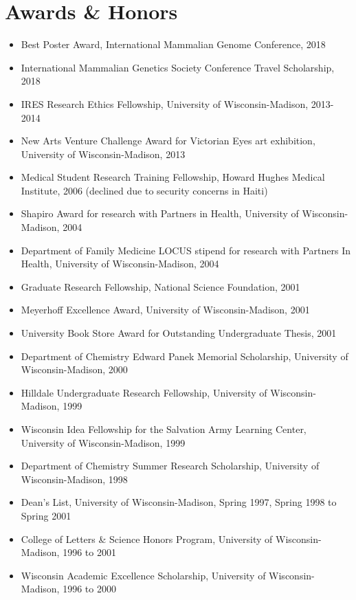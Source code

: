 \section*{Awards \& Honors}
\begin{itemize}
\item Best Poster Award, International Mammalian Genome Conference, 2018
\item International Mammalian Genetics Society Conference Travel Scholarship, 2018
\item IRES Research Ethics Fellowship, University of Wisconsin-Madison, 2013-2014
\item New Arts Venture Challenge Award for Victorian Eyes art exhibition, University of Wisconsin-Madison, 2013
\item Medical Student Research Training Fellowship, Howard Hughes Medical Institute, 2006 (declined due to security concerns in Haiti)
\item Shapiro Award for research with Partners in Health, University of Wisconsin-Madison, 2004
\item Department of Family Medicine LOCUS stipend for research with Partners In Health, University of Wisconsin-Madison, 2004
\item Graduate Research Fellowship, National Science Foundation, 2001
\item Meyerhoff Excellence Award, University of Wisconsin-Madison, 2001
\item University Book Store Award for Outstanding Undergraduate Thesis, 2001
\item Department of Chemistry Edward Panek Memorial Scholarship, University of Wisconsin-Madison, 2000
\item Hilldale Undergraduate Research Fellowship, University of Wisconsin-Madison, 1999
\item Wisconsin Idea Fellowship for the Salvation Army Learning Center, University of Wisconsin-Madison, 1999
\item Department of Chemistry Summer Research Scholarship, University of Wisconsin-Madison, 1998
\item Dean's List, University of Wisconsin-Madison, Spring 1997, Spring 1998 to Spring 2001
\item College of Letters \& Science Honors Program, University of Wisconsin-Madison, 1996 to 2001
\item Wisconsin Academic Excellence Scholarship, University of Wisconsin-Madison, 1996 to 2000
\end{itemize}
